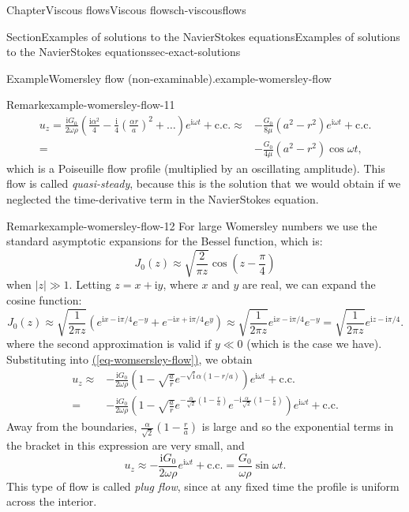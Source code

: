 \documentclass[oneside,10pt,]{book}
\newcommand{\xreffont}{\relax}
\numberwithin{equation}{section}
\newcommand{\im}{\mathrm{i}}
\begin{document}
\begin{chapterptx}{Chapter}{Viscous flows}{}{Viscous flows}{}{}{ch-viscousflows}
\begin{sectionptx}{Section}{Examples of solutions to the Navier\textendash{}Stokes equations}{}{Examples of solutions to the Navier\textendash{}Stokes equations}{}{}{sec-exact-solutions}
\begin{example}{Example}{Womersley flow (non-examinable).}{example-womersley-flow}
\begin{remark}{Remark}{}{example-womersley-flow-11}
\begin{align*}
u_z=\frac{\im G_0}{2\omega\rho}\left(\frac{\im\alpha^2}4-\frac{\im}{4}\left(\frac{\alpha r}{a}\right)^2+\dots\right)e^{\im\omega t}+\mathrm{c.c.}
\approx&-\frac{G_0}{8\mu}\left(a^2-r^2\right)e^{\im\omega t}+\mathrm{c.c.}\\
=&-\frac{G_0}{4\mu}\left(a^2-r^2\right)\cos\omega t,
\end{align*}
which is a Poiseuille flow profile (multiplied by an oscillating amplitude). This flow is called \emph{quasi-steady}, because this is the solution that we would obtain if we neglected the time-derivative term in the Navier\textendash{}Stokes equation.%
\end{remark}
\begin{remark}{Remark}{}{example-womersley-flow-12}%
For large Womersley numbers we use the standard asymptotic expansions for the Bessel function, which is:%
\begin{equation*}
J_0(z)\approx\sqrt{\frac{2}{\pi z}}\cos\left(z-\frac{\pi}{4}\right)
\end{equation*}
when \(|z|\gg1\). Letting \(z=x+\im y\), where \(x\) and \(y\) are real, we can expand the cosine function:%
\begin{equation*}
J_0(z)\approx\sqrt{\frac{1}{2\pi z}}\left(e^{\im x-\im\pi/4}e^{-y}+e^{-\im x+\im\pi/4}e^{y}\right)
\approx\sqrt{\frac{1}{2\pi z}}e^{\im x-\im\pi/4}e^{-y}=\sqrt{\frac{1}{2\pi z}}e^{\im z-\im\pi/4}.
\end{equation*}
where the second approximation is valid if \(y\ll0\) (which is the case we have). Substituting into \hyperref[eq-womsersley-flow]{({\xreffont\ref{eq-womsersley-flow}})}, we obtain%
\begin{align*}
u_z\approx&-\frac{\im G_0}{2\omega\rho}\left(1-\sqrt{\frac{a}{r}}e^{-\sqrt{\im}\alpha(1-r/a)}\right)e^{\im\omega t}+\mathrm{c.c.}\\
=&-\frac{\im G_0}{2\omega\rho}\left(1-\sqrt{\frac{a}{r}}e^{-\frac{\alpha}{\sqrt{2}}(1-\frac{r}{a})}e^{-\im\frac{\alpha}{\sqrt{2}}(1-\frac{r}{a})}\right)e^{\im\omega t}+\mathrm{c.c.}
\end{align*}
Away from the boundaries, \(\frac{\alpha}{\sqrt{2}}(1-\frac{r}{a})\) is large and so the exponential terms in the bracket in this expression are very small, and%
\begin{equation*}
u_z\approx-\frac{\im G_0}{2\omega\rho}e^{\im\omega t}+\mathrm{c.c.}
=\frac{G_0}{\omega\rho}\sin\omega t.
\end{equation*}
This type of flow is called \emph{plug flow}, since at any fixed time the profile is uniform across the interior.%

\end{remark}
\end{example}
\end{sectionptx}
\end{chapterptx}
\end{document}
